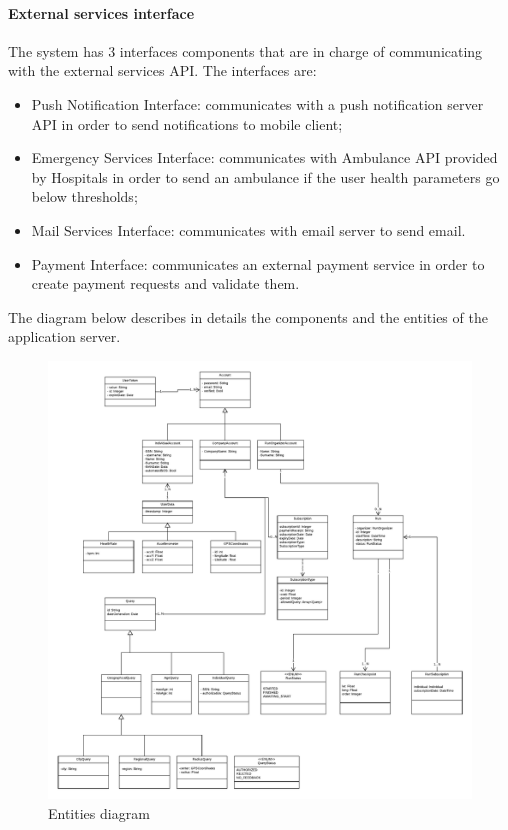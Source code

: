 \paragraph{External services interface} \mbox{} \newline
The system has 3 interfaces components that are in charge of communicating with the external services API.
The interfaces are:
\begin{itemize}
    \item Push Notification Interface: communicates with a push notification server API in order to send notifications to mobile client;
    \item Emergency Services Interface: communicates with Ambulance API provided by Hospitals in order to send an ambulance if the user health parameters go below thresholds;
    \item Mail Services Interface: communicates with email server to send email.
    \item Payment Interface: communicates an external payment service in order to create payment requests and validate them.
\end{itemize}

The diagram below describes in details the components and the entities of the application server.


\begin{figure}[H]
	\includegraphics[width=\textwidth,height=\textheight,keepaspectratio]{assets/UML_Entities.pdf}
	\caption{Entities diagram}
	\label{fig:UMLEntityDiagrams}
\end{figure}
